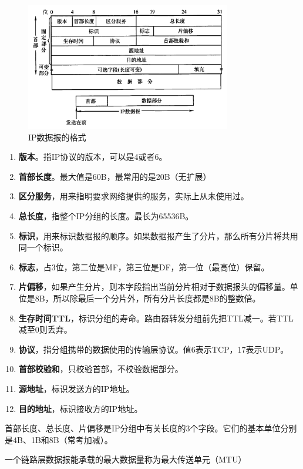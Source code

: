 \documentclass[12pt, a4paper, oneside]{ctexart}
\begin{document}
\begin{figure}
    \centering
    \includegraphics[width=0.8\textwidth]{./images/ip_datagram.png}
    \caption{IP数据报的格式}
\end{figure}

\begin{enumerate}
    \item {\bf 版本}。指IP协议的版本，可以是4或者6。
    \item {\bf 首部长度}。最大值是60B，最常用的是20B（无扩展）
    \item {\bf 区分服务}，用来指明要求网络提供的服务，实际上从未使用过。
    \item {\bf 总长度}，指整个IP分组的长度。最长为65536B。
    \item {\bf 标识}，用来标识数据报的顺序。如果数据报产生了分片，那么所有分片将共用同一个标识。
    \item {\bf 标志}，占3位，第二位是MF，第三位是DF，第一位（最高位）保留。
    \item {\bf 片偏移}，如果产生分片，则本字段指出当前分片相对于数据报头的偏移量。单位是8B，所以除最后一个分片外，所有分片长度都是8B的整数倍。
    \item {\bf 生存时间TTL}，标识分组的寿命。路由器转发分组前先把TTL减一。若TTL减至0则丢弃。
    \item {\bf 协议}，指分组携带的数据使用的传输层协议。值6表示TCP，17表示UDP。
    \item {\bf 首部校验和}，只校验首部，不校验数据部分。
    \item {\bf 源地址}，标识发送方的IP地址。
    \item {\bf 目的地址}，标识接收方的IP地址。
\end{enumerate}

首部长度、总长度、片偏移是IP分组中有关长度的3个字段。它们的基本单位分别是4B、1B和8B（常考加减）。

一个链路层数据报能承载的最大数据量称为最大传送单元（MTU）
\end{document}
